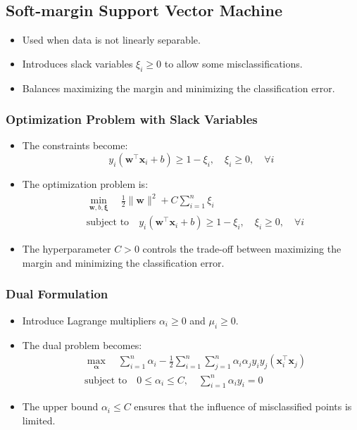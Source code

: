 \documentclass{article}
\begin{document}
\subsection{Soft-margin Support Vector Machine}

\begin{itemize}
    \item Used when data is not linearly separable.
    \item Introduces slack variables $\xi_i \geq 0$ to allow some misclassifications.
    \item Balances maximizing the margin and minimizing the classification error.
\end{itemize}

\subsubsection{Optimization Problem with Slack Variables}

\begin{itemize}
    \item The constraints become:
    \[
    y_i (\mathbf{w}^\top \mathbf{x}_i + b) \geq 1 - \xi_i, \quad \xi_i \geq 0, \quad \forall i
    \]
    \item The optimization problem is:
    \[
    \begin{aligned}
    & \min_{\mathbf{w}, b, \boldsymbol{\xi}} \quad \frac{1}{2} \|\mathbf{w}\|^2 + C \sum_{i=1}^n \xi_i \\
    & \text{subject to} \quad y_i (\mathbf{w}^\top \mathbf{x}_i + b) \geq 1 - \xi_i, \quad \xi_i \geq 0, \quad \forall i
    \end{aligned}
    \]
    \item The hyperparameter $C > 0$ controls the trade-off between maximizing the margin and minimizing the classification error.
\end{itemize}

\subsubsection{Dual Formulation}

\begin{itemize}
    \item Introduce Lagrange multipliers $\alpha_i \geq 0$ and $\mu_i \geq 0$.
    \item The dual problem becomes:
    \[
    \begin{aligned}
    & \max_{\boldsymbol{\alpha}} \quad \sum_{i=1}^n \alpha_i - \frac{1}{2} \sum_{i=1}^n \sum_{j=1}^n \alpha_i \alpha_j y_i y_j (\mathbf{x}_i^\top \mathbf{x}_j) \\
    & \text{subject to} \quad 0 \leq \alpha_i \leq C, \quad \sum_{i=1}^n \alpha_i y_i = 0
    \end{aligned}
    \]
    \item The upper bound $\alpha_i \leq C$ ensures that the influence of misclassified points is limited.
\end{itemize}
\end{document}
